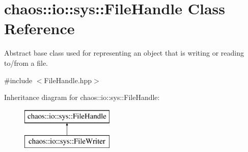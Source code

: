 \hypertarget{classchaos_1_1io_1_1sys_1_1_file_handle}{\section{chaos\-:\-:io\-:\-:sys\-:\-:File\-Handle Class Reference}
\label{classchaos_1_1io_1_1sys_1_1_file_handle}
}


Abstract base class used for representing an object that is writing or reading to/from a file.  




{\ttfamily \#include $<$File\-Handle.\-hpp$>$}

Inheritance diagram for chaos\-:\-:io\-:\-:sys\-:\-:File\-Handle\-:\begin{figure}[H]
\begin{center}
\leavevmode
\includegraphics[height=2.000000cm]{classchaos_1_1io_1_1sys_1_1_file_handle}
\end{center}
\end{figure}
